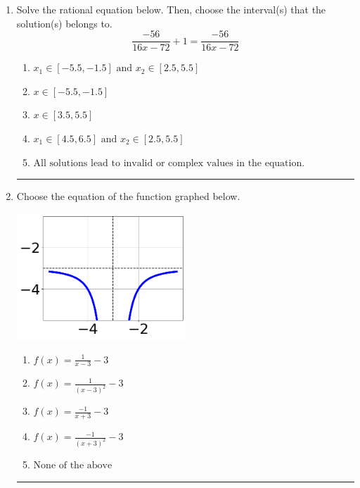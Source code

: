 \documentclass[14pt]{extbook}
\newcommand{\litem}[1]{\item#1\hspace*{-1cm}\rule{\textwidth}{0.4pt}}
\begin{document}
\begin{enumerate}
\litem{
Solve the rational equation below. Then, choose the interval(s) that the solution(s) belongs to.\[ \frac{-56}{16x -72} + 1 = \frac{-56}{16x -72} \]\begin{enumerate}[label=\Alph*.]
\item \( x_1 \in [-5.5, -1.5] \text{ and } x_2 \in [2.5,5.5] \)
\item \( x \in [-5.5,-1.5] \)
\item \( x \in [3.5,5.5] \)
\item \( x_1 \in [4.5, 6.5] \text{ and } x_2 \in [2.5,5.5] \)
\item \( \text{All solutions lead to invalid or complex values in the equation.} \)

\end{enumerate} }
\litem{
Choose the equation of the function graphed below.
\begin{center}
    \includegraphics[width=0.5\textwidth]{../Figures/rationalGraphToEquationA.png}
\end{center}
\begin{enumerate}[label=\Alph*.]
\item \( f(x) = \frac{1}{x - 3} - 3 \)
\item \( f(x) = \frac{1}{(x - 3)^2} - 3 \)
\item \( f(x) = \frac{-1}{x + 3} - 3 \)
\item \( f(x) = \frac{-1}{(x + 3)^2} - 3 \)
\item \( \text{None of the above} \)


\end{enumerate}}
\end{enumerate}
\end{document}
